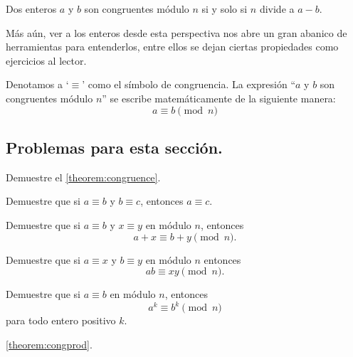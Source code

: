 \begin{theorem}\label{theorem:congruence}
	Dos enteros $a$ y $b$ son congruentes
	módulo $n$ si y solo si $n$ divide a $a - b$.
\end{theorem}

Más aún, ver a los enteros desde esta perspectiva
nos abre un gran abanico de herramientas
para entenderlos, entre ellos se dejan ciertas
propiedades como ejercicios al lector.

\begin{definition}
	Denotamos a `$\equiv$' como el símbolo
	de congruencia. La expresión
	``$a$ y $b$ son congruentes módulo $n$''
	se escribe matemáticamente de la siguiente
	manera:
	\[a \equiv b \pmod n\]
\end{definition}

\subsection*{Problemas para esta sección. }
\begin{problem}
Demuestre el \autoref{theorem:congruence}.
\end{problem}

\begin{problem}
Demuestre que si $a \equiv b$ y $b \equiv c$,
entonces $a \equiv c$.
\end{problem}

\begin{problem}
Demuestre que si $a \equiv b$ y $x \equiv y$ en
módulo $n$, entonces
\[a + x \equiv b + y \pmod n.\]
\end{problem}

\begin{problem}
\label{theorem:congprod}
Demuestre que si $a \equiv x$ y $b \equiv y$
en módulo $n$ entonces
\[ab \equiv xy \pmod n.\]
\end{problem}

\begin{problem}
Demuestre que si $a \equiv b$ en módulo $n$,
entonces
\[a^k \equiv b^k \pmod n\]
para todo entero positivo $k$.

\begin{hints}
	\begin{hint}
		\autoref{theorem:congprod}.
	\end{hint}
\end{hints}
\end{problem}

